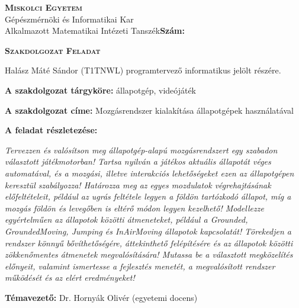 \begin{flushleft}
\textsc{\bfseries Miskolci Egyetem}\\
Gépészmérnöki és Informatikai Kar\\
Alkalmazott Matematikai Intézeti Tanszék\hspace*{4cm}\hfil \textbf{Szám:}
\end{flushleft}
\vskip 0.5cm
\begin{center}
\large\textsc{\bfseries Szakdolgozat Feladat}
\end{center}
\vskip 0.5cm
Halász Máté Sándor (T1TNWL) programtervező informatikus jelölt részére.\newline

\noindent\textbf{A szakdolgozat tárgyköre:} állapotgép, videójáték\newline

\noindent\textbf{A szakdolgozat címe:} Mozgásrendszer kialakítása állapotgépek használatával\newline

\noindent\textbf{A feladat részletezése:}

\medskip

\emph{Tervezzen és valósítson meg állapotgép-alapú mozgásrendszert egy szabadon választott játékmotorban!
Tartsa nyilván a játékos aktuális állapotát véges automatával, és a mozgási, illetve interakciós lehetőségeket ezen az állapotgépen keresztül szabályozza!
Határozza meg az egyes mozdulatok végrehajtásának előfeltételeit, például az ugrás feltétele legyen a földön tartózkodó állapot, míg a mozgás földön és levegőben is eltérő módon legyen kezelhető!
Modellezze egyértelműen az állapotok közötti átmeneteket, például a Grounded, GroundedMoving, Jumping és InAirMoving állapotok kapcsolatát!
Törekedjen a rendszer könnyű bővíthetőségére, áttekinthető felépítésére és az állapotok közötti zökkenőmentes átmenetek megvalósítására!
Mutassa be a választott megközelítés előnyeit, valamint ismertesse a fejlesztés menetét, a megvalósított rendszer működését és az elért eredményeket!}

\medskip

\vfill

\noindent\textbf{Témavezető:} Dr. Hornyák Olivér (egyetemi docens) \newline


